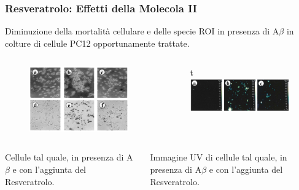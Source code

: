 \documentclass[9pt]{beamer}
\begin{document}
\begin{frame}
	\frametitle{Resveratrolo: Effetti della Molecola II}
	
	Diminuzione della mortalità cellulare e delle specie ROI in presenza di A$\beta$ in colture di cellule PC12 opportunamente trattate.
	\begin{columns}
		\begin{column}{0.5\textwidth}
			\begin{figure}
				\includegraphics[width=\textwidth]{immagini/apo_resveratrolo.png}
			\end{figure}
		\end{column}
		\begin{column}{0.5\textwidth}
			\begin{figure}{t}
				\includegraphics[width=\textwidth]{immagini/roi_resveratrolo.png}
			\end{figure}
			
		\end{column}
	\end{columns}
	\medskip
	\begin{columns}
		\begin{column}{0.5\textwidth}
			Cellule tal quale, in presenza di A$\beta$ e con l'aggiunta del Resveratrolo.
		\end{column}
		\begin{column}{0.5\textwidth}
			Immagine UV di cellule tal quale, in presenza di A$\beta$ e con l'aggiunta del Resveratrolo.
		\end{column}
	\end{columns}
	
\end{frame}
\end{document}
